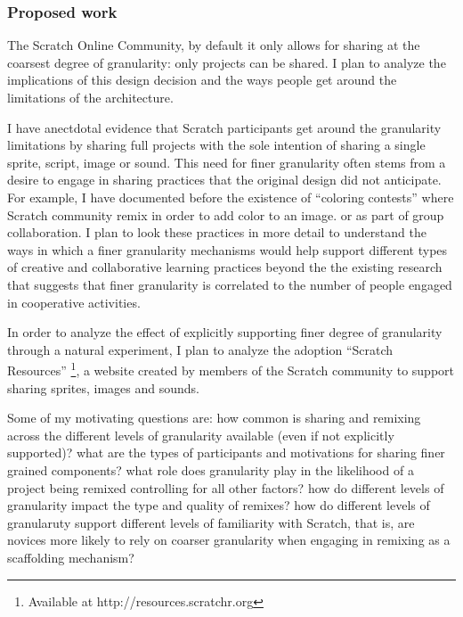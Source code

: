 \subsubsection{Proposed work}
The Scratch Online Community, by default it only allows for sharing at the coarsest degree of granularity: only projects can be shared. 
I plan to analyze the implications of this design decision and the ways  people get around the limitations of the architecture.

I have anectdotal evidence that Scratch participants get around the granularity limitations by sharing full projects with the sole intention of sharing a single sprite, script, image or sound.
This need for finer granularity often stems from a desire to engage in sharing practices that the original design did not anticipate. For example, I have documented before the existence of ``coloring contests'' \citep{nickerson_appropriation_2011} where Scratch community remix in order to add color to an image. or as part of group collaboration.
I plan to look these practices in more detail to understand the ways in which a finer granularity mechanisms would help support different types of creative and collaborative learning practices beyond the the existing research that suggests that finer granularity is correlated to the number of people engaged in cooperative activities.

In order to analyze the effect of explicitly supporting finer degree of granularity through a natural experiment, I plan to analyze the adoption ``Scratch Resources'' \footnote{Available at http://resources.scratchr.org}, a website created by members of the Scratch community to support sharing sprites, images and sounds. 

Some of my motivating questions are: 
how common is sharing and remixing across the different levels of granularity available (even if not explicitly supported)?
what are the types of participants and motivations for sharing finer grained components?
what role does granularity play in the likelihood of a project being remixed controlling for all other factors?
how do different levels of granularity impact the type and quality of remixes?
how do different levels of granularuty support different levels of familiarity with Scratch, that is, are novices more likely to rely on coarser granularity when engaging in remixing as a scaffolding mechanism?

